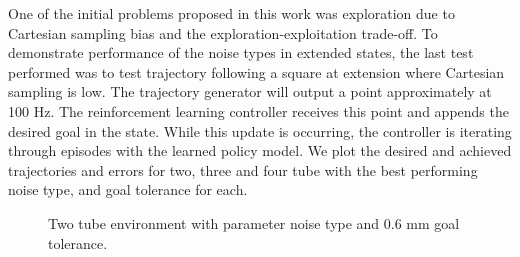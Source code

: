 One of the initial problems proposed in this work was exploration due to Cartesian sampling bias and the exploration-exploitation trade-off. To demonstrate performance of the noise types in extended states, the last test performed was to test trajectory following a square at extension where Cartesian sampling is low. The trajectory generator will output a point approximately at 100 Hz. The reinforcement learning controller receives this point and appends the desired goal in the state. While this update is occurring, the controller is iterating through episodes with the learned policy model. We plot the desired and achieved trajectories and errors for two, three and four tube with the best performing noise type, and goal tolerance for each.

\begin{figure}
    \caption{Two tube environment with parameter noise type and 0.6 mm goal tolerance.}
    \label{fig:two-tube-traj}
\end{figure}

